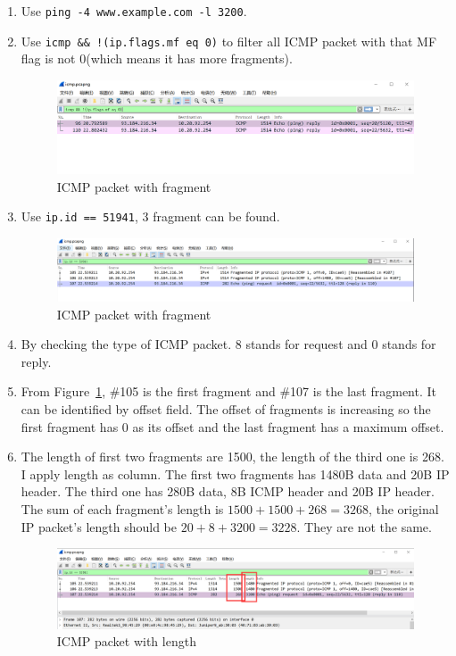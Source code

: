 \documentclass[12pt,letterpaper]{ctexart}
\begin{document}
\begin{enumerate}
  \item Use \verb|ping -4 www.example.com -l 3200|.
  \item Use \verb|icmp && !(ip.flags.mf eq 0)| to filter all ICMP packet with that MF flag is not 0(which means it has more fragments).
  \begin{figure}[H]
    \centering
    \includegraphics[width=0.8\linewidth]{assets/icmp_mf.png}
    \caption{ICMP packet with fragment}
  \end{figure}
  \item Use \verb|ip.id == 51941|, 3 fragment can be found.
  \begin{figure}[H]
    \centering
    \includegraphics[width=0.8\linewidth]{assets/ip_fragment.png}
    \caption{ICMP packet with fragment}
    \label{fig:packet_with_fragment}
  \end{figure}
  \item By checking the type of ICMP packet. 8 stands for request and 0 stands for reply.
  \item From Figure~\ref{fig:packet_with_fragment}, \#105 is the first fragment and \#107 is the last fragment. It can be identified by offset field.
  The offset of fragments is increasing so the first fragment has 0 as its offset and the last fragment has a maximum offset.
  \item The length of first two fragments are 1500, the length of the third one is 268.
  I apply length as column. The first two fragments has 1480B data and 20B IP header. The third one has 280B data, 8B ICMP header and 20B IP header.
  The sum of each fragment's length is $1500 + 1500 + 268 = 3268$, the original IP packet's length should be $20 + 8 + 3200 = 3228$.
  They are not the same.
  \begin{figure}[H]
    \centering
    \includegraphics[width=0.8\linewidth]{assets/ip_length.png}
    \caption{ICMP packet with length}
    \label{fig:packet_with_length}
  \end{figure}
\end{enumerate}
\end{document}
